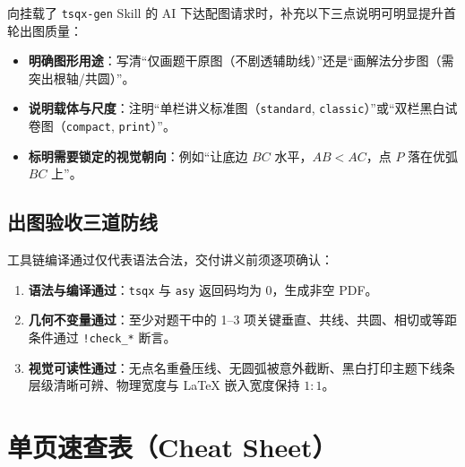 \documentclass[11pt,oneside,fontset=none]{ctexbook}
\newcommand{\code}[1]{\texttt{#1}}
\begin{document}
向挂载了 \code{tsqx-gen} Skill 的 AI 下达配图请求时，补充以下三点说明可明显提升首轮出图质量：
\begin{itemize}
  \item \textbf{明确图形用途}：写清“仅画题干原图（不剧透辅助线）”还是“画解法分步图（需突出根轴/共圆）”。
  \item \textbf{说明载体与尺度}：注明“单栏讲义标准图（\code{standard}, \code{classic}）”或“双栏黑白试卷图（\code{compact}, \code{print}）”。
  \item \textbf{标明需要锁定的视觉朝向}：例如“让底边 \(BC\) 水平，\(AB < AC\)，点 \(P\) 落在优弧 \(BC\) 上”。
\end{itemize}

\section{出图验收三道防线}

工具链编译通过仅代表语法合法，交付讲义前须逐项确认：
\begin{enumerate}
  \item \textbf{语法与编译通过}：\code{tsqx} 与 \code{asy} 返回码均为 \(0\)，生成非空 PDF。
  \item \textbf{几何不变量通过}：至少对题干中的 1--3 项关键垂直、共线、共圆、相切或等距条件通过 \code{!check\_*} 断言。
  \item \textbf{视觉可读性通过}：无点名重叠压线、无圆弧被意外截断、黑白打印主题下线条层级清晰可辨、物理宽度与 \LaTeX{} 嵌入宽度保持 \(1:1\)。
\end{enumerate}

\appendix
\chapter{单页速查表（Cheat Sheet）}
\end{document}
